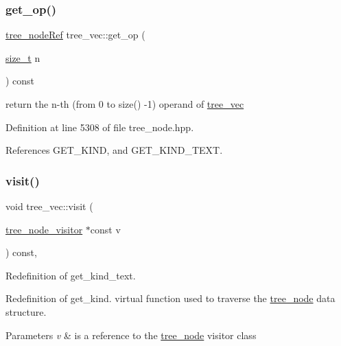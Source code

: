 \subsubsection{\texorpdfstring{get\+\_\+op()}{get\_op()}}
{\footnotesize\ttfamily \hyperlink{tree__node_8hpp_a6ee377554d1c4871ad66a337eaa67fd5}{tree\+\_\+node\+Ref} tree\+\_\+vec\+::get\+\_\+op (\begin{DoxyParamCaption}\item[{\hyperlink{tutorial__fpt__2017_2intro_2sixth_2test_8c_a7c94ea6f8948649f8d181ae55911eeaf}{size\+\_\+t}}]{n }\end{DoxyParamCaption}) const\hspace{0.3cm}{\ttfamily [inline]}}



return the n-\/th (from 0 to size() -\/1) operand of \hyperlink{structtree__vec}{tree\+\_\+vec} 



Definition at line 5308 of file tree\+\_\+node.\+hpp.



References G\+E\+T\+\_\+\+K\+I\+ND, and G\+E\+T\+\_\+\+K\+I\+N\+D\+\_\+\+T\+E\+XT.

\mbox{\label{structtree__vec_a6dfe22713c2cb390fe2c35f208d26872}} 
\subsubsection{\texorpdfstring{visit()}{visit()}}
{\footnotesize\ttfamily void tree\+\_\+vec\+::visit (\begin{DoxyParamCaption}\item[{\hyperlink{classtree__node__visitor}{tree\+\_\+node\+\_\+visitor} $\ast$const}]{v }\end{DoxyParamCaption}) const\hspace{0.3cm}{\ttfamily [override]}, {\ttfamily [virtual]}}



Redefinition of get\+\_\+kind\+\_\+text. 

Redefinition of get\+\_\+kind. virtual function used to traverse the \hyperlink{classtree__node}{tree\+\_\+node} data structure. 
\begin{DoxyParams}{Parameters}
{\em v} & is a reference to the \hyperlink{classtree__node}{tree\+\_\+node} visitor class \\
\hline
\end{DoxyParams}


